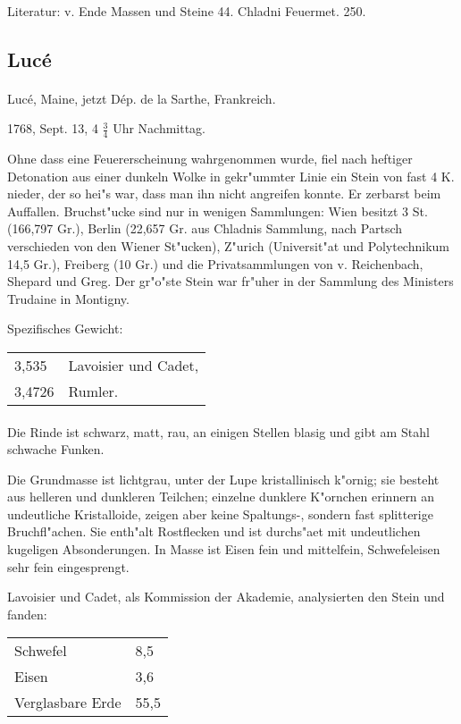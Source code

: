 \documentclass[a4paper, 11pt, oneside]{article}
\begin{document}
\paragraph{}
Literatur: v. Ende Massen und Steine 44. Chladni Feuermet. 250.
\subsection{Lucé}
\normalsize
\paragraph{}
Lucé, Maine, jetzt Dép. de la Sarthe, Frankreich.

1768, Sept. 13, 4 $\frac{3}{4}$ Uhr Nachmittag.

Ohne dass eine Feuererscheinung wahrgenommen wurde, fiel nach heftiger Detonation aus einer dunkeln Wolke in gekr"ummter Linie ein Stein von fast 4 K. nieder, der so hei"s war, dass man ihn nicht angreifen konnte. Er zerbarst beim Auffallen. Bruchst"ucke sind nur in wenigen Sammlungen: Wien besitzt 3 St. (166,797 Gr.), Berlin (22,657 Gr. aus Chladnis Sammlung, nach Partsch verschieden von den Wiener St"ucken), Z"urich (Universit"at und Polytechnikum 14,5 Gr.), Freiberg (10 Gr.) und die Privatsammlungen von v. Reichenbach, Shepard und Greg. Der gr"o"ste Stein war fr"uher in der Sammlung des Ministers Trudaine in Montigny.

Spezifisches Gewicht:
\begin{table}[!ht]
    \centering
    \begin{tabular}{l l}
        3,535 & Lavoisier und Cadet,\\
        3,4726 & Rumler.
    \end{tabular}
\end{table}
\paragraph{}
Die Rinde ist schwarz, matt, rau, an einigen Stellen blasig und gibt am Stahl schwache Funken.

Die Grundmasse ist lichtgrau, unter der Lupe kristallinisch k"ornig; sie besteht aus helleren und dunkleren Teilchen; einzelne dunklere K"ornchen erinnern an undeutliche Kristalloide, zeigen aber keine Spaltungs-, sondern fast splitterige Bruchfl"achen. Sie enth"alt Rostflecken und ist durchs"aet mit undeutlichen kugeligen Absonderungen. In Masse ist Eisen fein und mittelfein, Schwefeleisen sehr fein eingesprengt.

Lavoisier und Cadet, als Kommission der Akademie, analysierten den Stein und fanden:
\begin{table}[!ht]
    \centering
    \begin{tabular}{l l}
        Schwefel & 8,5\\
        Eisen & 3,6\\
        Verglasbare Erde & 55,5
    \end{tabular}
\end{table}
\end{document}
